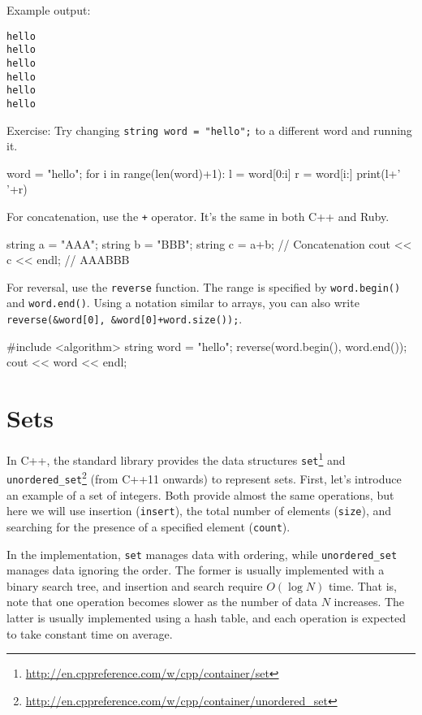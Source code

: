 Example output:\\
\begin{alltt}
 hello
h ello
he llo
hel lo
hell o
hello 
\end{alltt}

Exercise: Try changing \texttt{string word = "hello";} to a different word and running it.

\begin{pybox}
word = "hello";
for i in range(len(word)+1):
    l = word[0:i]
    r = word[i:]
    print(l+' '+r)  
\end{pybox}

For concatenation, use the \texttt{+} operator. It's the same in both C++ and Ruby.

\begin{cbox}
    string a = "AAA";
    string b = "BBB";
    string c = a+b; // Concatenation
    cout << c << endl; // AAABBB
\end{cbox}

For reversal, use the \texttt{reverse} function. The range is specified by \texttt{word.begin()} and \texttt{word.end()}. Using a notation similar to arrays, you can also write \texttt{reverse(\&word[0], \&word[0]+word.size());}.
 
\begin{cbox}
#include <algorithm>
    string word = "hello";
    reverse(word.begin(), word.end());
    cout << word << endl;  
\end{cbox}

\section{Sets}

In C++, the standard library provides the data structures \texttt{set}\footnote{\url{http://en.cppreference.com/w/cpp/container/set}} and \texttt{unordered\_set}\footnote{\url{http://en.cppreference.com/w/cpp/container/unordered_set}} (from C++11 onwards) to represent sets.
First, let's introduce an example of a set of integers.
Both provide almost the same operations, but here we will use insertion (\texttt{insert}), the total number of elements (\texttt{size}), and searching for the presence of a specified element (\texttt{count}).

In the implementation, \texttt{set} manages data with ordering, while \texttt{unordered\_set} manages data ignoring the order. The former is usually implemented with a binary search tree, and insertion and search require $O(\log N)$ time. That is, note that one operation becomes slower as the number of data $N$ increases. The latter is usually implemented using a hash table, and each operation is expected to take constant time on average.

